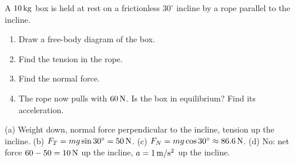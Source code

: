 \begin{exo}{}
A $10\,\mathrm{kg}$ box is held at rest on a frictionless $30^\circ$ incline by a rope parallel to the incline.
\begin{enumerate}[label=(\alph*)]
\item Draw a free-body diagram of the box.
\item Find the tension in the rope.
\item Find the normal force.
\item The rope now pulls with $60\,\mathrm{N}$. Is the box in equilibrium? Find its acceleration.
\end{enumerate}
\work{5cm}
\begin{solution}
(a) Weight down, normal force perpendicular to the incline, tension up the incline. \;(b) $F_T=mg\sin30^\circ=50\,\mathrm{N}$. \;(c) $F_N=mg\cos30^\circ\approx86.6\,\mathrm{N}$. \;(d) No: net force $60-50=10\,\mathrm{N}$ up the incline, $a=1\,\mathrm{m/s^2}$ up the incline.
\end{solution}
\end{exo}

